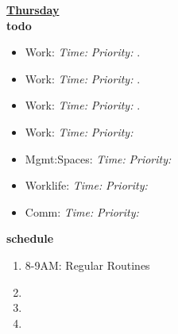 \documentclass[serif, mathserif, final]{beamer}
\newcommand{\timeEst}[1]{\textit{Time:} \textit{#1}}
\newcommand{\priority}[1]{\textit{Priority:} \textit{#1}}
\newcommand{\deadline}[1]{#1}
\begin{document}
{            \textbf{\small \underline{Thursday}} \\
            \textbf{\small todo} \\
            \begin{itemize} 
              \tiny \item \tiny Work:                                      \deadline{} \timeEst{} \priority{}. 
            \item \tiny Work:                                              \deadline{ }   \timeEst{}  \priority{}.
            \item \tiny Work:                                              \deadline{ }   \timeEst{}  \priority{}. 
            \item \tiny Work:                                              \deadline{} \timeEst{} \priority{} 
            \item \tiny Mgmt:Spaces:                                       \deadline{} \timeEst{} \priority{} 
            \item \tiny Worklife:                                          \deadline{} \timeEst{} \priority{} 
            \item \tiny Comm:                                              \deadline{} \timeEst{} \priority{} 
            \end{itemize} 
            \textbf{\small schedule} \\
            \begin{enumerate}
              \tiny \item \tiny 8-9AM: Regular Routines 
            \item \tiny 
            \item \tiny 
            \item \tiny   
            \end{enumerate} 
            
}
\end{document}
